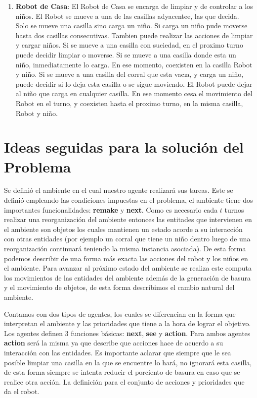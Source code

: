 \documentclass[a4paper,10pt,twocolumn]{article}
\begin{document}
\begin{enumerate}
	\item[] \textbf{Robot de Casa}: El Robot de Casa se encarga de limpiar y de controlar a los ni\~nos. El Robot se mueve a una de las casillas adyacentee, las que decida. Solo se mueve una casilla sino carga un ni\~no. Si carga un ni\~no pude moverse hasta dos casillas consecutivas. Tambien puede realizar las acciones de limpiar y cargar ni\~nos. Si se mueve a una casilla con suciedad, en el proximo turno puede decidir limpiar o moverse. Si se mueve a una casilla donde esta un ni\~no, inmediatamente lo carga. En ese momento, coexisten en la casilla Robot y ni\~no. Si se mueve a una casilla del corral que esta vacıa, y carga un ni\~no, puede decidir si lo deja esta casilla o se sigue moviendo. El Robot puede dejar al ni\~no que carga en cualquier casilla. En ese momento cesa el movimiento del Robot en el turno, y coexisten hasta el proximo turno, en la misma casilla, Robot y ni\~no.

\end{enumerate}


\section*{Ideas seguidas para la soluci\'on del Problema}

Se defini\'o el ambiente en el cual nuestro agente realizar\'a sus tareas. Este se defini\'o empleando las condiciones impuestas en el problema, el ambiente tiene dos importantes funcionalidades: \textbf{remake} y \textbf{next}. Como es necesario cada $t$ turnos realizar una reorganizaci\'on del ambiente entonces las entitades que intervienen en el ambiente son objetos los cuales mantienen un estado acorde a su interacci\'on con otras entidades (por ejemplo un corral que tiene un ni\~no dentro luego de una reorganizaci\'on continuar\'a teniendo la misma instancia asociada). De esta forma podemos describir de una forma m\'as exacta las acciones del robot y los ni\~nos en el ambiente. Para avanzar al pr\'oximo estado del ambiente se realiza  este computa los movimientos de las entidades del ambiente adem\'as de la generaci\'on de basura y el movimiento de objetos, de esta forma describimos el cambio natural del ambiente.

Contamos con dos tipos de agentes, los cuales se diferencian en la forma que interpretan el ambiente y las prioridades que tiene a la hora de lograr el objetivo. Los agentes definen 3 funciones b\'asicas: \textbf{next}, \textbf{see} y \textbf{action}. Para ambos agentes \textbf{action} ser\'a la misma ya que describe que acciones hace de acuerdo a su interacci\'on con las entidades. Es importante aclarar que siempre que le sea posible limpiar una casilla en la que se encuentre lo har\'a, no ignorar\'a esta casilla, de esta forma siempre se intenta reducir el porciento de basura en caso que se realice otra acci\'on. La definici\'on para el conjunto de acciones y prioridades que da el robot.
\end{document}
